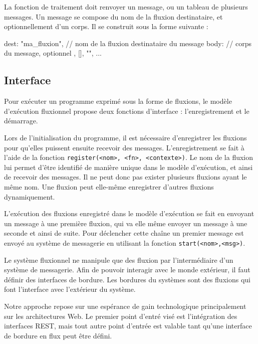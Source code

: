 La fonction de traitement doit renvoyer un message, ou un tableau de plusieurs messages.
Un message se compose du nom de la fluxion destinataire, et optionnellement d'un corps.
Il se construit sous la forme suivante :

\begin{code}
{
  dest: "ma_fluxion", // nom de la fluxion destinataire du message
  body: // corps du message, optionnel
      {}, [], "", ...
}
\end{code}


\subsection{Interface}

Pour exécuter un programme exprimé sous la forme de fluxions, le modèle d'exécution fluxionnel propose deux fonctions d'interface : l'enregistrement et le démarrage.

Lors de l'initialisation du programme, il est nécessaire d'enregistrer les fluxions pour qu'elles puissent ensuite recevoir des messages.
L'enregistrement se fait à l'aide de la fonction \texttt{register(<nom>, <fn>, <contexte>)}.
Le nom de la fluxion lui permet d'être identifié de manière unique dans le modèle d'exécution, et ainsi de recevoir des messages.
Il ne peut donc pas exister plusieurs fluxions ayant le même nom.
Une fluxion peut elle-même enregistrer d'autres fluxions dynamiquement.

L'exécution des fluxions enregistré dans le modèle d'exécution se fait en envoyant un message à une première fluxion, qui va elle même envoyer un message à une seconde et ainsi de suite.
Pour déclencher cette chaîne un premier message est envoyé au système de messagerie en utilisant la fonction \texttt{start(<nom>,<msg>)}.


Le système fluxionnel ne manipule que des fluxion par l'intermédiaire d'un système de messagerie.
Afin de pouvoir interagir avec le monde extérieur, il faut définir des interfaces de bordure.
Les bordures du systèmes sont des fluxions qui font l'interface avec l'extérieur du système.

Notre approche repose sur une espérance de gain technologique principalement sur les architectures Web.
Le premier point d'entré visé est l'intégration des interfaces REST, mais tout autre point d'entrée est valable tant qu'une interface de bordure en flux peut être défini.

